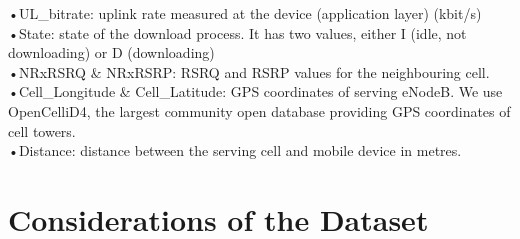 •UL\_bitrate: uplink rate measured at the device (application layer) (kbit/s) \\
•State: state of the download process. It has two values, either I (idle, not downloading) or D (downloading) \\
•NRxRSRQ \& NRxRSRP: RSRQ and RSRP values for the neighbouring cell. \\
•Cell\_Longitude \& Cell\_Latitude: GPS coordinates of serving eNodeB. We use OpenCelliD4, the largest community open database providing GPS coordinates of cell towers. \\
•Distance: distance between the serving cell and mobile device in metres.

\section{Considerations of the Dataset}
